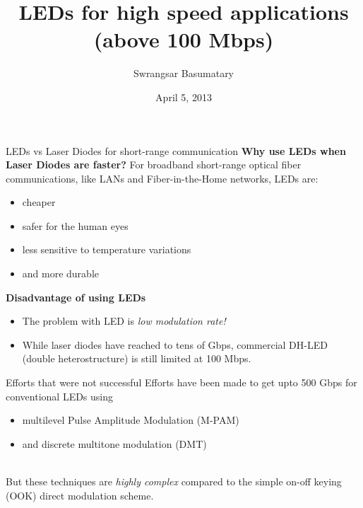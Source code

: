 \documentclass[mathserif]{beamer}
\title{LEDs for high speed applications \\ (above 100 Mbps)}
\author{Swrangsar Basumatary}
\institute{IIT Bombay, Powai}
\date{April 5, 2013}
\begin{document}
    \frame{\titlepage}
    
    \begin{frame}{LEDs vs Laser Diodes for short-range communication}
	    \pause
	    \textbf{Why use LEDs when Laser Diodes are faster?}
            \pause For broadband short-range optical fiber communications, like
LANs and Fiber-in-the-Home networks, LEDs are:
            \pause
            \begin{itemize}[<+->]
                \item cheaper
                \item safer for the human eyes
                \item less sensitive to temperature variations
                \item and more durable
            \end{itemize}
  
        \pause
        \textbf{Disadvantage of using LEDs}
            \begin{itemize}
                \pause \item The problem with LED is \pause \emph{low modulation rate!}\\
                \pause \item While laser diodes have reached to tens of Gbps, \pause 
                commercial DH-LED (double heterostructure) is still limited at 100 Mbps.
            \end{itemize}
        
    \end{frame}
    
    \begin{frame}{Efforts that were not successful}
        \pause
        Efforts have been made to get upto 500 Gbps for conventional LEDs using
        \begin{itemize}
            \pause \item multilevel Pulse Amplitude Modulation (M-PAM)
            \pause \item and discrete multitone modulation (DMT) \\~\\
        \end{itemize} 
        
        \pause But these techniques are \emph{highly complex} compared to the simple on-off keying (OOK) direct modulation scheme.
    \end{frame}
    
    
    
\end{document}

